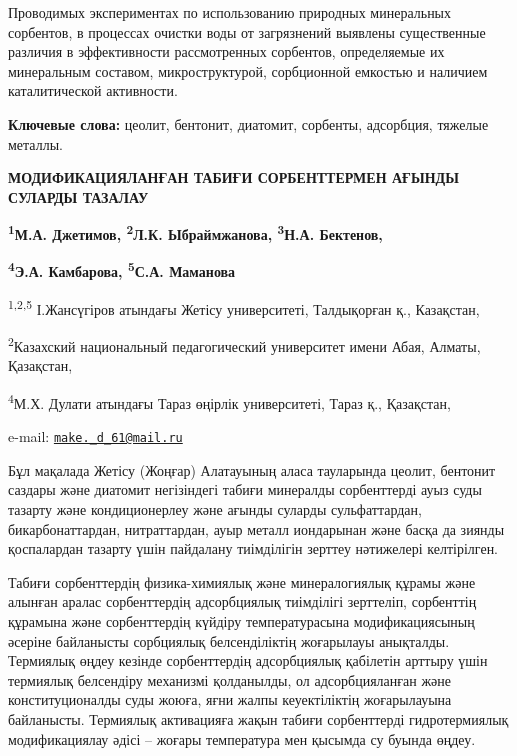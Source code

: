 Проводимых экспериментах по использованию природных минеральных
сорбентов, в процессах очистки воды от загрязнений выявлены существенные
различия в эффективности рассмотренных сорбентов, определяемые их
минеральным составом, микроструктурой, сорбционной емкостью и наличием
каталитической активности.

{\bfseries Ключевые слова:} цеолит, бентонит, диатомит, сорбенты,
адсорбция, тяжелые металлы.

\begin{articleheader}
{\bfseries МОДИФИКАЦИЯЛАНҒАН ТАБИҒИ СОРБЕНТТЕРМЕН АҒЫНДЫ СУЛАРДЫ ТАЗАЛАУ}

{\bfseries \textsuperscript{1}М.А. Джетимов\textsuperscript{\envelope },
\textsuperscript{2}Л.К. Ыбраймжанова, \textsuperscript{3}Н.А. Бектенов,}

{\bfseries \textsuperscript{4}Э.А. Камбарова, \textsuperscript{5}С.А.
Маманова}
\end{articleheader}

\begin{affiliation}
\textsuperscript{1,2,5} І.Жансүгіров атындағы Жетісу университеті,
Талдықорған қ., Казақстан,

\textsuperscript{2}Казахский национальный педагогический университет
имени Абая, Алматы, Қазақстан,

\textsuperscript{4}М.Х. Дулати атындағы Тараз өңірлік университеті,
Тараз қ., Қазақстан,

e-mail:
\href{mailto:make._d_61@mail.ru}{\nolinkurl{make.\_d\_61@mail.ru}}
\end{affiliation}

Бұл мақалада Жетісу (Жоңғар) Алатауының аласа тауларында цеолит,
бентонит саздары және диатомит негізіндегі табиғи минералды сорбенттерді
ауыз суды тазарту және кондиционерлеу және ағынды суларды сульфаттардан,
бикарбонаттардан, нитраттардан, ауыр металл иондарынан және басқа да
зиянды қоспалардан тазарту үшін пайдалану тиімділігін зерттеу нәтижелері
келтірілген.

Табиғи сорбенттердің физика-химиялық және минералогиялық құрамы және
алынған аралас сорбенттердің адсорбциялық тиімділігі зерттеліп,
сорбенттің құрамына және сорбенттердің күйдіру температурасына
модификациясының әсеріне байланысты сорбциялық белсенділіктің жоғарылауы
анықталды. Термиялық өңдеу кезінде сорбенттердің адсорбциялық қабілетін
арттыру үшін термиялық белсендіру механизмі қолданылды, ол
адсорбцияланған және конституционалды суды жоюға, яғни жалпы
кеуектіліктің жоғарылауына байланысты. Термиялық активацияға жақын
табиғи сорбенттерді гидротермиялық модификациялау әдісі -- жоғары
температура мен қысымда су буында өңдеу.

